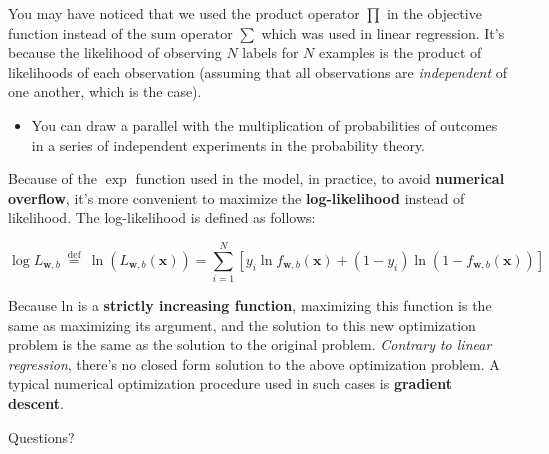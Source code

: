 \documentclass[9pt,dvipsnames]{beamer}
\begin{document}
\begin{frame}
	You may have noticed that we used the product operator $\prod$ in the objective function instead of the sum operator $\sum$ which was used in linear regression. It's because the likelihood of observing $N$ labels for $N$ examples is the product of likelihoods of each observation (assuming that all observations are \textit{independent} of one another, which is the case). 
	\begin{itemize}
		\item You can draw a parallel with the multiplication of probabilities of outcomes in a series of independent experiments in the probability theory.
	\end{itemize}
	Because of the $\exp$ function used in the model, in practice, to avoid \textbf{numerical overflow}, it's more convenient to maximize the \textbf{log-likelihood} instead of likelihood. The log-likelihood is defined as follows:
	
	$$
	\log L_{\mathbf{w}, b} \stackrel{\text { def }}{=} \ln \left(L_{\mathbf{w}, b}(\mathbf{x})\right)=\sum_{i=1}^{N}\left[y_{i} \ln f_{\mathbf{w}, b}(\mathbf{x})+\left(1-y_{i}\right) \ln \left(1-f_{\mathbf{w}, b}(\mathbf{x})\right)\right]
	$$
	
	Because ln is a \textbf{strictly increasing function}, maximizing this function is the same as maximizing its argument, and the solution to this new optimization problem is the same as the solution to the original problem. \textit{Contrary to linear regression}, there's no closed form solution to the above optimization problem. A typical numerical optimization procedure used in such cases is \textbf{gradient descent}.
\end{frame}

\begin{frame}
    \begin{center}
        \Huge Questions?
    \end{center}
\end{frame}
\end{document}
